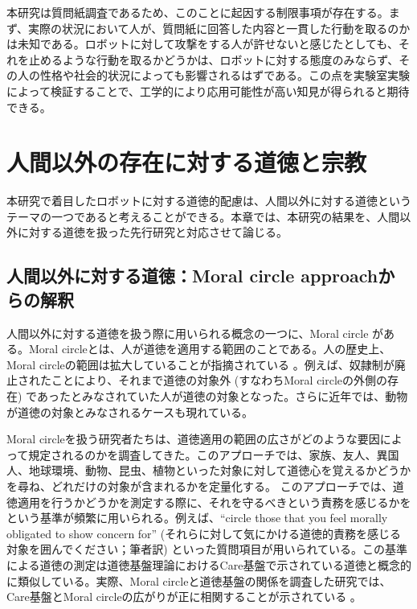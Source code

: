 \documentclass[a4j,12pt]{jreport}
\begin{document}
本研究は質問紙調査であるため、このことに起因する制限事項が存在する。まず、実際の状況において人が、質問紙に回答した内容と一貫した行動を取るのかは未知である。ロボットに対して攻撃をする人が許せないと感じたとしても、それを止めるような行動を取るかどうかは、ロボットに対する態度のみならず、その人の性格や社会的状況によっても影響されるはずである。この点を実験室実験によって検証することで、工学的により応用可能性が高い知見が得られると期待できる。



\newpage
\chapter{人間以外の存在に対する道徳と宗教}
本研究で着目したロボットに対する道徳的配慮は、人間以外に対する道徳というテーマの一つであると考えることができる。本章では、本研究の結果を、人間以外に対する道徳を扱った先行研究と対応させて論じる。

\section{人間以外に対する道徳：Moral circle approachからの解釈}
人間以外に対する道徳を扱う際に用いられる概念の一つに、Moral circle \cite{singer}がある。Moral circleとは、人が道徳を適用する範囲のことである。人の歴史上、Moral circleの範囲は拡大していることが指摘されている\cite{lecky, singer} 。例えば、奴隷制が廃止されたことにより、それまで道徳の対象外 (すなわちMoral circleの外側の存在) であったとみなされていた人が道徳の対象となった。さらに近年では、動物が道徳の対象とみなされるケースも現れている。


Moral circleを扱う研究者たちは、道徳適用の範囲の広さがどのような要因によって規定されるのかを調査してきた。このアプローチでは、家族、友人、異国人、地球環境、動物、昆虫、植物といった対象に対して道徳心を覚えるかどうかを尋ね、どれだけの対象が含まれるかを定量化する。
このアプローチでは、道徳適用を行うかどうかを測定する際に、それを守るべきという責務を感じるかをという基準が頻繁に用いられる。例えば、``circle those that you feel morally obligated to show concern for'' (それらに対して気にかける道徳的責務を感じる対象を囲んでください；筆者訳) \cite{laham}といった質問項目が用いられている。この基準による道徳の測定は道徳基盤理論におけるCare基盤で示されている道徳と概念的に類似している。実際、Moral circleと道徳基盤の関係を調査した研究では、Care基盤とMoral circleの広がりが正に相関することが示されている\cite{crim} 。
\end{document}
